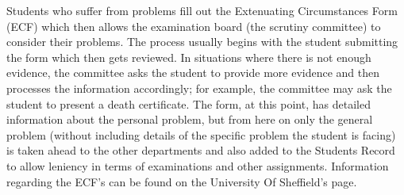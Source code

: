 \documentclass[../main.tex]{subfiles}
\begin{document}
\raggedright

Students who suffer from problems fill out the Extenuating Circumstances Form (ECF) which then allows the examination board (the
scrutiny committee) to consider their problems. The process usually begins
with the student submitting the form which then gets reviewed. In situations where there is not enough evidence, the committee asks the student to provide more evidence and then processes the information accordingly; for example, the committee may ask the student to present a death certificate. The form, at this point, has detailed information about the personal problem, but from here on only the general problem (without including details of the specific problem the student is facing) is taken ahead to the other departments and also added to the Students Record to allow leniency in terms of examinations and other assignments. Information regarding the ECF's can be found on the University
Of Sheffield's page.\cite{ecfuni}
\end{document}
